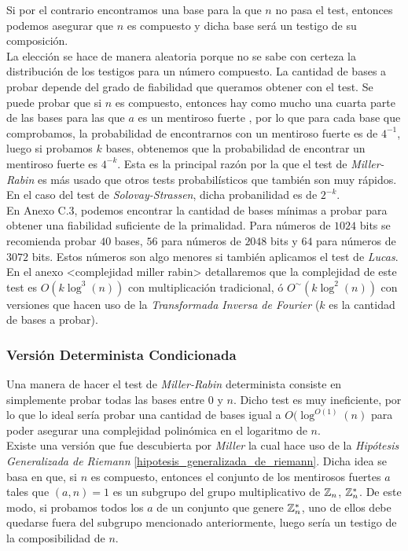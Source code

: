Si por el contrario encontramos una base para la que $n$ no pasa el test, entonces podemos asegurar que $n$ es compuesto y dicha base será un testigo de su composición.\\

La elección se hace de manera aleatoria porque no se sabe con certeza la distribución de los testigos para un número compuesto. La cantidad de bases a probar depende del grado de fiabilidad que queramos obtener con el test. Se puede probar que si $n$ es compuesto, entonces hay como mucho una cuarta parte de las bases para las que $a$ es un mentiroso fuerte \cite{rabin_1980}, por lo que para cada base que comprobamos, la probabilidad de encontrarnos con un mentiroso fuerte es de $4^{-1}$, luego si probamos $k$ bases, obtenemos que la probabilidad de encontrar un mentiroso fuerte es $4^{-k}$. Esta es la principal razón por la que el test de \textit{Miller-Rabin} es más usado que otros tests probabilísticos que también son muy rápidos. En el caso del test de \textit{Solovay-Strassen}, dicha probanilidad es de $2^{-k}$.\\

En \cite{digital_signature_standard} Anexo C.3, podemos encontrar la cantidad de bases mínimas a probar para obtener una fiabilidad suficiente de la primalidad. Para números de $1024$ bits se recomienda probar $40$ bases, $56$ para números de $2048$ bits y $64$ para números de $3072$ bits. Estos números son algo menores si también aplicamos el test de \textit{Lucas}.\\

En el anexo <complejidad miller rabin> detallaremos que la complejidad de este test es $O(k\log^3(n))$ con multiplicación tradicional, ó $O^\sim(k\log^2(n))$ con versiones que hacen uso de la \textit{Transformada Inversa de Fourier} ($k$ es la cantidad de bases a probar).

\subsubsection{Versión Determinista Condicionada}

Una manera de hacer el test de \textit{Miller-Rabin} determinista consiste en simplemente probar todas las bases entre $0$ y $n$. Dicho test es muy ineficiente, por lo que lo ideal sería probar una cantidad de bases igual a $O(\log^{O(1)}(n)$ para poder asegurar una complejidad polinómica en el logaritmo de $n$.\\

Existe una versión que fue descubierta por \textit{Miller} la cual hace uso de la \textit{Hipótesis Generalizada de Riemann} \ref{hipotesis_generalizada_de_riemann}. Dicha idea se basa en que, si $n$ es compuesto, entonces el conjunto de los mentirosos fuertes $a$ tales que $(a, n) = 1$ es un subgrupo del grupo multiplicativo de $\mathbb{Z}_n$, $\mathbb{Z}_n^*$. De este modo, si probamos todos los $a$ de un conjunto que genere $\mathbb{Z}_n^*$, uno de ellos debe quedarse fuera del subgrupo mencionado anteriormente, luego sería un testigo de la composibilidad de $n$.\\

